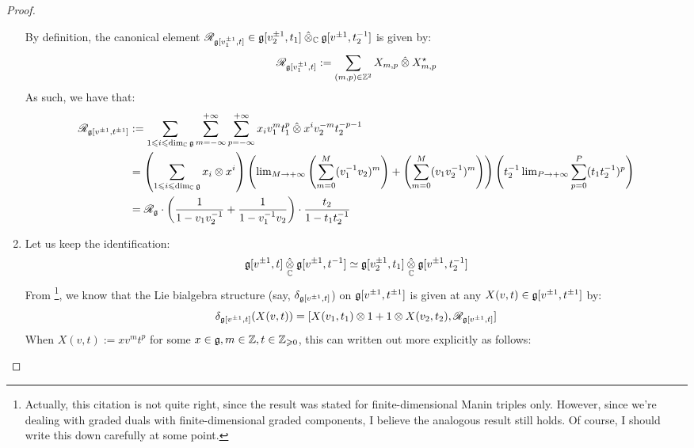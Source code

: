 \begin{proof}
\begin{enumerate}
                        By definition, the canonical element $\scrR_{\g[v_1^{\pm 1}, t]} \in \g[v_2^{\pm 1}, t_1] \hattensor_{\bbC} \g[v^{\pm 1}, t_2^{-1}]$ is given by:
                            $$\scrR_{\g[v_1^{\pm 1}, t]} := \sum_{(m, p) \in \Z^2} X_{m, p} \hattensor X_{m, p}^{\star}$$
                        As such, we have that:
                            $$
                                \begin{aligned}
                                    \scrR_{\g[v^{\pm 1}, t^{\pm 1}]} & := \sum_{1 \leq i \leq \dim_{\bbC} \g} \sum_{m = -\infty}^{+\infty} \sum_{p = -\infty}^{+\infty} x_i v_1^m t_1^p \hattensor x^i v_2^{-m} t_2^{-p - 1}
                                    \\
                                    & = \left( \sum_{1 \leq i \leq \dim_{\bbC} \g} x_i \tensor x^i \right) \left( \lim_{M \to +\infty} \left(\sum_{m = 0}^M (v_1^{-1} v_2)^m \right) + \left(\sum_{m = 0}^M (v_1 v_2^{-1})^m\right) \right) \left( t_2^{-1} \lim_{P \to +\infty} \sum_{p = 0}^P (t_1 t_2^{-1})^p \right)
                                    \\
                                    & = \scrR_{\g} \cdot \left( \frac{1}{1 - v_1 v_2^{-1}} + \frac{1}{1 - v_1^{-1} v_2} \right) \cdot \frac{t_2}{1 - t_1 t_2^{-1}}
                                \end{aligned}
                            $$
                        \item Let us keep the identification:
                            $$\g[v^{\pm 1}, t] \hattensor_{\bbC} \g[v^{\pm 1}, t^{-1}] \cong \g[v_2^{\pm 1}, t_1] \hattensor_{\bbC} \g[v^{\pm 1}, t_2^{-1}]$$
                        From \cite[pp. 5]{etingof_kazhdan_quantisation_1}\footnote{Actually, this citation is not quite right, since the result was stated for finite-dimensional Manin triples only. However, since we're dealing with graded duals with finite-dimensional graded components, I believe the analogous result still holds. Of course, I should write this down carefully at some point.}, we know that the Lie bialgebra structure (say, $\delta_{\mathfrak{g}[v^{\pm 1}, t]}$) on $\mathfrak{g}[v^{\pm 1}, t^{\pm 1}]$ is given at any $X(v, t) \in \mathfrak{g}[v^{\pm 1}, t^{\pm 1}]$ by:
                            $$\delta_{\g[v^{\pm 1}, t]}( X(v, t) ) = [X(v_1, t_1) \tensor 1 + 1 \tensor X(v_2, t_2), \scrR_{\g[v^{\pm 1}, t]}]$$
                        When $X(v, t) := x v^m t^p$ for some $x \in \mathfrak{g}, m \in \mathbb{Z}, t \in \mathbb{Z}_{\geqslant 0}$, this can written out more explicitly as follows:

\end{enumerate}
\end{proof}
